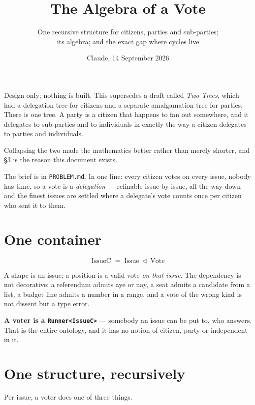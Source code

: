 \documentclass[11pt,a4paper]{article}
\title{\vspace{-2em}The Algebra of a Vote}
\author{\normalsize One recursive structure for citizens, parties and sub-parties;\\[0.2em]
\normalsize its algebra; and the exact gap where cycles live}
\date{\normalsize Claude, 14 September 2026}
\begin{document}
\maketitle
\vspace{-1em}

\begin{sectionbox}
Design only; nothing is built. This supersedes a draft called \emph{Two Trees},
which had a delegation tree for citizens and a separate amalgamation tree for
parties. There is one tree. A party is a citizen that happens to fan out
somewhere, and it delegates to sub-parties and to individuals in exactly the way
a citizen delegates to parties and individuals.

Collapsing the two made the mathematics better rather than merely shorter, and
\S3 is the reason this document exists.

The brief is in \texttt{PROBLEM.md}. In one line: every citizen votes on every
issue, nobody has time, so a vote is a \emph{delegation} --- refinable issue by
issue, all the way down --- and the finest issues are settled where a delegate's
vote counts once per citizen who sent it to them.
\end{sectionbox}

\section{One container}

\[
  \mathrm{IssueC} \;=\; \mathrm{Issue} \,\triangleleft\, \mathrm{Vote}
\]

A shape is an issue; a position is a valid vote \emph{on that issue}. The
dependency is not decorative: a referendum admits aye or nay, a seat admits a
candidate from a list, a budget line admits a number in a range, and a vote of
the wrong kind is not dissent but a type error.

\begin{sectionbox}
\textbf{A voter is a \texttt{Runner<IssueC>}} --- somebody an issue can be put
to, who answers. That is the entire ontology, and it has no notion of citizen,
party or independent in it.
\end{sectionbox}

\section{One structure, recursively}

Per issue, a voter does one of three things.
\end{document}
